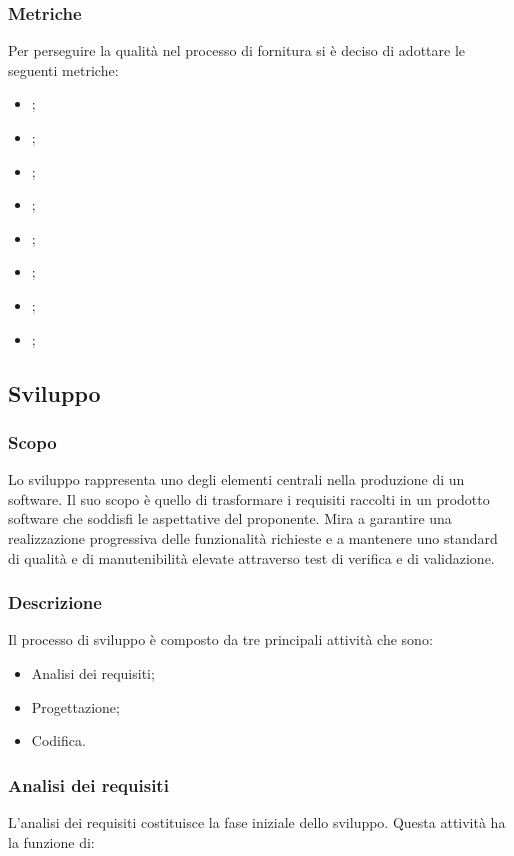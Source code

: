 \subsubsection{Metriche}
Per perseguire la qualità nel processo di fornitura si è deciso di adottare le
seguenti metriche:
\begin{itemize}
    \item {};
    \item {};
    \item {};
    \item {};
    \item {};
    \item {};
    \item {};
    \item {};
\end{itemize}

\subsection{Sviluppo}
\subsubsection{Scopo}
Lo sviluppo rappresenta uno degli elementi centrali nella produzione di un
software. Il suo scopo è quello di trasformare i requisiti raccolti in un
prodotto software che soddisfi le aspettative del proponente. Mira a garantire
una realizzazione progressiva delle funzionalità richieste e a mantenere uno
standard di qualità e di manutenibilità elevate attraverso test di verifica e
di validazione.

\subsubsection{Descrizione}
Il processo di sviluppo è composto da tre principali attività che sono:
\begin{itemize}
    \item Analisi dei requisiti;
    \item Progettazione;
    \item Codifica.
\end{itemize}

\subsubsection{Analisi dei requisiti}
L'analisi dei requisiti costituisce la fase iniziale dello sviluppo. Questa
attività ha la funzione di:

